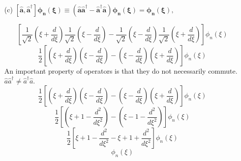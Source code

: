 \documentclass{article}
\begin{document}
{\begin{enumerate}
		\[
			\left[ \frac{1}{\sqrt{2}} \left( \xi - \frac{d}{d\xi} \right) \right]\left[ \frac{1}{\sqrt{2^n n!}} \left( \frac{m\omega}{\pi \hbar} \right)^{\frac{1}{4}} e^{-\frac{1}{2}\xi^2} H_n(\xi) \right]
		\]
		\[
			\frac{1}{\sqrt{2}} \frac{1}{\sqrt{2^n n!}} \left( \frac{m\omega}{\pi \hbar} \right)^{\frac{1}{4}} \left[ \left( \xi e^{-\frac{1}{2}\xi^2} H_n(\xi) - \frac{d}{d\xi} \left( e^{-\frac{1}{2}\xi^2} H_n(\xi) \right) \right) \right]
		\]
		\[
			\frac{1}{\sqrt{2}} \frac{1}{\sqrt{2^n n!}} \left( \frac{m\omega}{\pi \hbar} \right)^{\frac{1}{4}} \left[ \left( \xi e^{-\frac{1}{2}\xi^2} H_n(\xi) - \left( -\xi e^{-\frac{1}{2}\xi^2} H_n(\xi) + e^{-\frac{1}{2}\xi^2} H'_n(\xi) \right) \right) \right]
		\]
		\[
			\frac{1}{\sqrt{2}} \frac{1}{\sqrt{2^n n!}} \left( \frac{m\omega}{\pi \hbar} \right)^{\frac{1}{4}} e^{-\frac{1}{2}\xi^2} \left[ 2\xi H_n(\xi) - H'_n(\xi) \right]
		\] \\
		Using the recurrence relation $H'_n(x) = 2nH_{n-1}(x)$
		\[
			\frac{1}{\sqrt{2}} \frac{1}{\sqrt{2^n n!}} \left( \frac{m\omega}{\pi \hbar} \right)^{\frac{1}{4}} e^{-\frac{1}{2}\xi^2} \left[ 2\xi H_n(\xi) - 2nH_{n-1}(\xi) \right]
		\] \\
		Using the recurrence relation $H_{n+1}(x) = 2x H_n(x) - 2nH_{n-1}(x)$
		\[
			\frac{1}{\sqrt{2^{n+1} n!}} \left( \frac{m\omega}{\pi \hbar} \right)^{\frac{1}{4}} e^{-\frac{1}{2}\xi^2} H_{n+1}(\xi)
		\]
		\[
			\frac{\sqrt{n+1}}{\sqrt{2^{n+1} (n+1)n!}} \left( \frac{m\omega}{\pi \hbar} \right)^{\frac{1}{4}} e^{-\frac{1}{2}\xi^2} H_{n+1}(\xi)
		\]
		Utilizing properties of $\bm{n!}$, $\bm{\frac{1}{(n+1)n!} = \frac{1}{(n+1)!}}$.
		\[
			\sqrt{n+1} \, \phi_{n+1}(\xi) = \frac{\sqrt{n+1}}{\sqrt{2^{n+1} (n+1)!}} \left( \frac{m\omega}{\pi \hbar} \right)^{\frac{1}{4}} e^{-\frac{1}{2}\xi^2} H_{n+1}(\xi)
		\]
		
		\item[(c)] $\bm{ \left[\hat{a},\hat{a}^{\dagger}\right]\phi_n(\xi) \equiv \left( \hat{a}\hat{a}^{\dagger} - \hat{a}^{\dagger}\hat{a} \right) \phi_n(\xi) = \phi_n(\xi), }$
		
		\[
			\left[\frac{1}{\sqrt{2}} \left( \xi + \frac{d}{d\xi} \right)\frac{1}{\sqrt{2}} \left( \xi - \frac{d}{d\xi} \right) - \frac{1}{\sqrt{2}} \left( \xi - \frac{d}{d\xi} \right)\frac{1}{\sqrt{2}} \left( \xi + \frac{d}{d\xi} \right) \right] \phi_n(\xi)
		\]
		\[
			\frac{1}{2} \left[ \left( \xi + \frac{d}{d\xi} \right) \left( \xi - \frac{d}{d\xi} \right) -  \left( \xi - \frac{d}{d\xi} \right) \left( \xi + \frac{d}{d\xi} \right) \right] \phi_n(\xi)
		\]
		An important property of operators is that they do not necessarily commute. $\hat{a}\hat{a}^{\dagger} \neq \hat{a}^{\dagger}\hat{a}$.
		\[
		\frac{1}{2} \left[ \left( \xi + \frac{d}{d\xi} \right) \left( \xi - \frac{d}{d\xi} \right) -  \left( \xi - \frac{d}{d\xi} \right) \left( \xi + \frac{d}{d\xi} \right) \right] \phi_n(\xi)
		\]
		\[
			\frac{1}{2} \left[ \left( \xi + 1 - \frac{d^2}{d\xi^2} \right) -  \left( \xi - 1 - \frac{d^2}{d\xi^2} \right) \right] \phi_n(\xi)
		\]
		\[
		\frac{1}{2} \left[  \xi + 1 - \frac{d^2}{d\xi^2} - \xi + 1 + \frac{d^2}{d\xi^2} \right] \phi_n(\xi)
		\]
		\[
			\phi_n(\xi)
		\]
		

\end{enumerate}}
\end{document}
